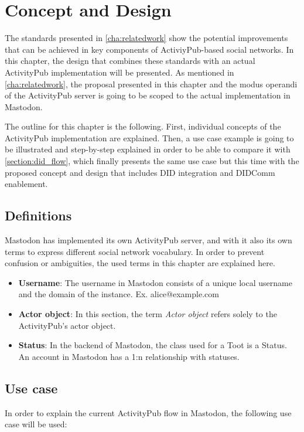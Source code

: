 \chapter{Concept and Design}
\label{cha:conceptanddesign}
 
The standards presented in \autoref{cha:relatedwork} show the potential improvements that can be achieved in key components of ActiviyPub-based social networks. In this chapter, the design that combines these standards with an actual ActivityPub implementation will be presented. As mentioned in \autoref{cha:relatedwork}, the proposal presented in this chapter and the modus operandi of the ActivityPub server is going to be scoped to the actual implementation in Mastodon.

The outline for this chapter is the following. First, individual concepts of the ActivityPub implementation are explained. Then, a use case example is going to be illustrated and step-by-step explained in order to be able to compare it with \autoref{section:did_flow}, which finally presents the same use case but this time with the proposed concept and design that includes DID integration and DIDComm enablement.
 
\section{Definitions}
Mastodon has implemented its own ActivityPub server, and with it also its own terms to express different social network vocabulary. In order to prevent confusion or ambiguities, the used terms in this chapter are explained here. 
 
\begin{itemize}
  \item \textbf{Username}: The username in Mastodon consists of a unique local username and the domain of the instance. Ex. alice@example.com
  \item \textbf{Actor object}: In this section, the term \emph{Actor object} refers solely to the ActivityPub's actor object. 
  \item \textbf{Status}: In the backend of Mastodon, the class used for a Toot is a Status. An account in Mastodon has a 1:n relationship with statuses.
\end{itemize}

\section{Use case}\label{section:use_case}
In order to explain the current ActivityPub flow in Mastodon, the following use case will be used:

